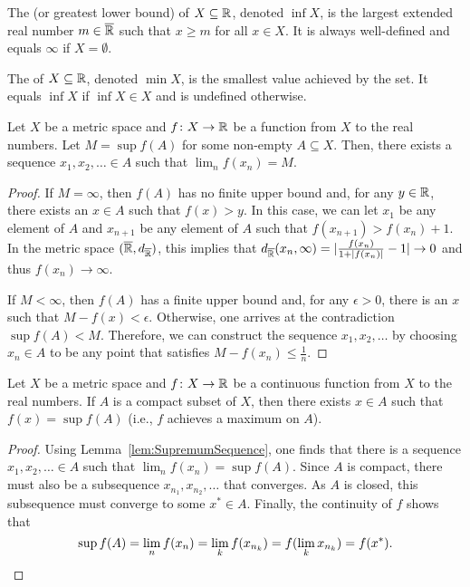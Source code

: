 \begin{definition}
The  (or greatest lower bound) of $X\subseteq \mathbb{R}$, denoted $\inf X$, is the largest extended real number $m \in \overline{\mathbb{R}}$ such that $x\geq m$ for all $x\in X$.
It is always well-defined and equals $\infty$ if $X=\emptyset$.
\end{definition}

\begin{definition}
The  of $X\subseteq \mathbb{R}$, denoted $\min X$, is the smallest value achieved by the set.
It equals $\inf X$ if $\inf X \in X$ and is undefined otherwise.
\end{definition}

\begin{lemma}
\label{lem:SupremumSequence}
Let $X$ be a metric space and $f \colon X\rightarrow \mathbb{R}$ be a function from $X$ to the real numbers.
Let $M = \sup f(A)$ for some non-empty $A \subseteq X$.
Then, there exists a sequence $x_1,x_2,\ldots \in A$ such that $\lim_n f(x_n) = M$.
\end{lemma}
\begin{proof}
If $M=\infty$, then $f(A)$ has no finite upper bound and, for any $y\in \mathbb{R}$, there exists an $x\in A$ such that $f(x)>y$.
In this case, we can let $x_1$ be any element of $A$ and $x_{n+1}$ be any element of $A$ such that $f(x_{n+1}) > f(x_n) + 1$.
In the metric space $(\overline{\mathbb{R}},d_{\overline{\mathbb{R}}})$, this implies that $d_{\overline{\mathbb{R}}}(x_n,\infty) = |\frac{f(x_n)}{1+|f(x_n)|} - 1| \to 0$ and thus $f(x_n) \to \infty$.

If $M<\infty$, then $f(A)$ has a finite upper bound and, for any $\epsilon >0$, there is an $x$ such that $M-f(x)<\epsilon$.
Otherwise, one arrives at the contradiction $\sup f(A) < M$.
Therefore, we can construct the sequence $x_1,x_2,\ldots$ by choosing $x_n\in A$ to be any point that satisfies $M-f(x_n)\leq \frac{1}{n}$.
\end{proof}

\begin{theorem}
Let $X$ be a metric space and $f \colon X\rightarrow \mathbb{R}$ be a continuous function from $X$ to the real numbers.
If $A$ is a compact subset of $X$, then there exists $x\in A$ such that $f(x)=\sup f(A)$ (i.e., $f$ achieves a maximum on $A$).
\end{theorem}
\begin{proof}
Using Lemma~\ref{lem:SupremumSequence}, one finds that there is a sequence $x_1,x_2,\ldots \in A$ such that $\lim_n f(x_n) = \sup f(A)$.
Since $A$ is compact, there must also be a subsequence $x_{n_1},x_{n_2},\ldots$ that converges.
As $A$ is closed, this subsequence must converge to some $x^* \in A$.
Finally, the continuity of $f$ shows that
\[\sup f(A) = \lim_n f(x_n) = \lim_k f(x_{n_k}) = f(\lim_k x_{n_k}) = f(x^*). \qedhere \]
\end{proof}

